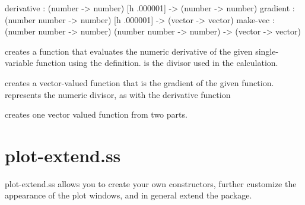 \documentclass{article}
\begin{document}
{\begin{schemedisplay}
derivative      : (number -> number) [h .000001] -> (number -> number)   
gradient : (number number -> number) [h .000001] -> (vector -> vector)
make-vec : (number number -> number) (number number -> number) -> (vector -> vector) 
\end{schemedisplay}

 creates a function that evaluates the numeric derivative of the given  single-variable function using the definition.  is the divisor used in the calculation.


 creates a vector-valued function that is the gradient of the given function. represents the numeric divisor, as with the derivative function


 creates one vector valued function from two parts.

\pagebreak


\label{plot-extend.ss}
\section{plot-extend.ss}



plot-extend.ss allows you to create your own constructors, further customize the appearance of the plot windows,
     and in general extend the package.


\label{2d-view}
\subsection{\scheme{2d-view%


Provides an interface to drawing 2dplots. Some methods call low-level functions while others are emulated in scheme.

\begin{itemize}
\item 
\scheme{set-labels : string string string -> void}


Sets x, y and title labels


\item 
\scheme{plot-vector : vector vector -> void}


Plots a single vector. First argument is the head, second is the tail.


\item 
\scheme{plot-vectors : (listof (list vector vector)) -> void}


Plots a list of vectors. Each vector is a list of two scheme \scheme{vector}s.



\end{itemize}}}}
\end{document}
